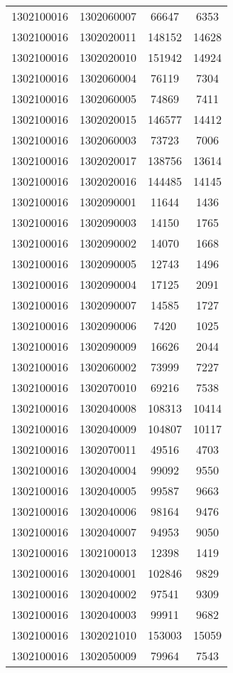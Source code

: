 \begin{longtable}{llcc}
1302100016 & 1302060007 & 66647 & 6353\\
1302100016 & 1302020011 & 148152 & 14628\\
1302100016 & 1302020010 & 151942 & 14924\\
1302100016 & 1302060004 & 76119 & 7304\\
1302100016 & 1302060005 & 74869 & 7411\\
1302100016 & 1302020015 & 146577 & 14412\\
1302100016 & 1302060003 & 73723 & 7006\\
1302100016 & 1302020017 & 138756 & 13614\\
1302100016 & 1302020016 & 144485 & 14145\\
1302100016 & 1302090001 & 11644 & 1436\\
1302100016 & 1302090003 & 14150 & 1765\\
1302100016 & 1302090002 & 14070 & 1668\\
1302100016 & 1302090005 & 12743 & 1496\\
1302100016 & 1302090004 & 17125 & 2091\\
1302100016 & 1302090007 & 14585 & 1727\\
1302100016 & 1302090006 & 7420 & 1025\\
1302100016 & 1302090009 & 16626 & 2044\\
1302100016 & 1302060002 & 73999 & 7227\\
1302100016 & 1302070010 & 69216 & 7538\\
1302100016 & 1302040008 & 108313 & 10414\\
1302100016 & 1302040009 & 104807 & 10117\\
1302100016 & 1302070011 & 49516 & 4703\\
1302100016 & 1302040004 & 99092 & 9550\\
1302100016 & 1302040005 & 99587 & 9663\\
1302100016 & 1302040006 & 98164 & 9476\\
1302100016 & 1302040007 & 94953 & 9050\\
1302100016 & 1302100013 & 12398 & 1419\\
1302100016 & 1302040001 & 102846 & 9829\\
1302100016 & 1302040002 & 97541 & 9309\\
1302100016 & 1302040003 & 99911 & 9682\\
1302100016 & 1302021010 & 153003 & 15059\\
1302100016 & 1302050009 & 79964 & 7543\\

\end{longtable}
